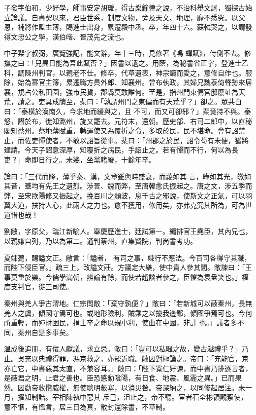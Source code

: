 \begin{pinyinscope}
 子發字伯和，少好學，師事安定胡瑗，得古樂鐘律之說，不治科舉文詞，獨探古始立論議。自書契以來，君臣世系，制度文物，旁及天文、地理，靡不悉究。以父恩，補將作監主薄，賜進士出身，累遷殿中丞。卒，年四十六。蘇軾哭之，以謂發得文忠公之學，漢伯喈、晉茂先之流也。



 中子棐字叔弼，廣覽強記，能文辭，年十三時，見修著《鳴
 蟬賦》，侍側不去。修撫之曰：「兒異日能為吾此賦否？」因書以遺之。用蔭，為秘書省正字，登進士乙科，調陳州判官，以親老不仕。修卒，代草遺表，神宗讀而愛之，意修自作也。服除，始為審官主簿，累遷職方員外郎、知襄州。曾布執政，其婦兄魏泰倚聲勢來居襄，規占公私田園，強市民貨，郡縣莫敢誰何。至是，指州門東偏官邸廢址為天荒，請之。吏具成牘至，棐曰：「孰謂州門之東偏而有天荒乎？」卻之。眾共白曰：「泰橫於漢南久，今求地而緩與之，且
 不可，而又可卻邪？」棐竟持不與。泰怒，譖於布，徙知潞州，旋又罷去。元符末，還朝。歷吏部、右司二郎中，以直秘閣知蔡州。蔡地薄賦重，轉運使又為覆折之令，多取於民，民不堪命。會有詔禁止，而佐吏憚使者，不敢以詔旨從事。棐曰：「州郡之於民，詔令茍有未便，猶將建請。今天子詔意深厚，知覆折之病民，手詔止之。若有憚而不行，何以為長吏？」命即日行之。未幾，坐黨籍廢，十餘年卒。



 論曰：「三代而降，薄乎秦、漢，文章雖與時盛衰，而藹如其
 言，曄如其光，皦如其音，蓋均有先王之遺烈。涉晉、魏而弊，至唐韓愈氏振起之。唐之文，涉五季而弊，至宋歐陽修又振起之。挽百川之頹波，息千古之邪說，使斯文之正氣，可以羽翼大道，扶持人心，此兩人之力也。愈不獲用，修用矣，亦弗克究其所為，可為世道惜也哉！



 劉敞，字原父，臨江新喻人。舉慶歷進士，廷試第一。編排官王堯臣，其內兄也，以親嫌自列，乃以為第二。通判蔡州，直集賢院，判尚書考功。



 夏竦薨，賜謚文正。敞言：「謚者，
 有司之事，竦行不應法。今百司各得守其職，而陛下侵臣官。」疏三上，改謚文莊。方議定大樂，使中貴人參其間。敞諫曰：「王事莫重於樂。今儒學滿朝，辨論有餘，而使若趙談者參之，臣懼為袁盎笑也。」權度支判官，徙三司使。



 秦州與羌人爭古渭地。仁宗問敞：「棄守孰便？」敞曰：「若新城可以蔽秦州，長無羌人之虞，傾國守焉可也。或地形險利，賊乘之以擾我邊鄙，傾國爭焉可也。今何所重輕，而殫財困民，捐士卒之命以規小利，使曲在中國，非計
 也。」議者多不同，秦州自是多事矣。



 溫成後追冊，有佞人獻議，求立忌。敞曰：「豈可以私暱之故，變古越禮乎？」乃止。吳充以典禮得罪，馮京救之，亦罷近職。敞因對極論之。帝曰：「充能官，京亦亡它，中書惡其太直，不兼容耳。」敞曰：「陛下寬仁好諫，而中書乃排逐言者，是蔽君之明，止君之善也。臣恐感動陰陽，有日食、地震、風霾之異。」已而果然。因勸帝收攬威權，無使聰明蔽塞，以消災咎。帝深納之，以同修起居注。未一月，擢知制誥。宰相陳執中惡其
 斥己，沮止之，帝不聽。宦者石全彬領觀察使，意不愜，有慍言，居三日為真，敞封還除書，不草制。




\end{pinyinscope}
